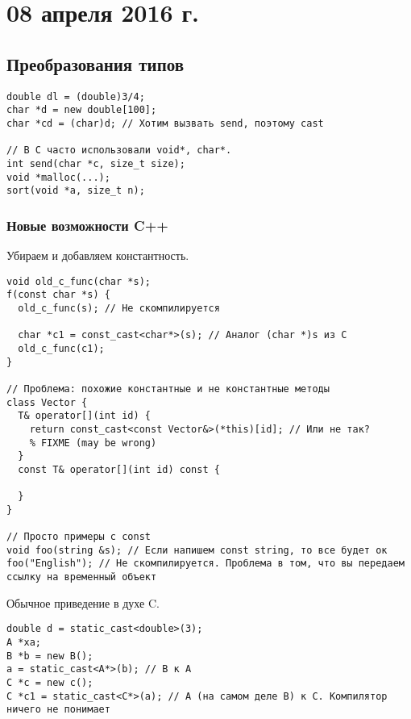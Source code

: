 \section{08 апреля 2016 г.}

\subsection{Преобразования типов}

\begin{verbatim}
double dl = (double)3/4;
char *d = new double[100];
char *cd = (char)d; // Хотим вызвать send, поэтому cast

// В C часто использовали void*, char*.
int send(char *c, size_t size);
void *malloc(...);
sort(void *a, size_t n);
\end{verbatim}

\subsubsection*{Новые возможности C++}


  Убираем и добавляем константность.

  \begin{verbatim}
void old_c_func(char *s);
f(const char *s) {
  old_c_func(s); // Не скомпилируется

  char *c1 = const_cast<char*>(s); // Аналог (char *)s из C
  old_c_func(c1);
}

// Проблема: похожие константные и не константные методы
class Vector {
  T& operator[](int id) {
    return const_cast<const Vector&>(*this)[id]; // Или не так?
    % FIXME (may be wrong)
  }
  const T& operator[](int id) const {

  }
}

// Просто примеры с const
void foo(string &s); // Если напишем const string, то все будет ок
foo("English"); // Не скомпилируется. Проблема в том, что вы передаем ссылку на временный объект

  \end{verbatim}

  Обычное приведение в духе C.

  \begin{verbatim}
double d = static_cast<double>(3);
A *xa;
B *b = new B();
a = static_cast<A*>(b); // B к A
C *c = new c();
C *c1 = static_cast<C*>(a); // A (на самом деле B) к С. Компилятор ничего не понимает

  \end{verbatim}

